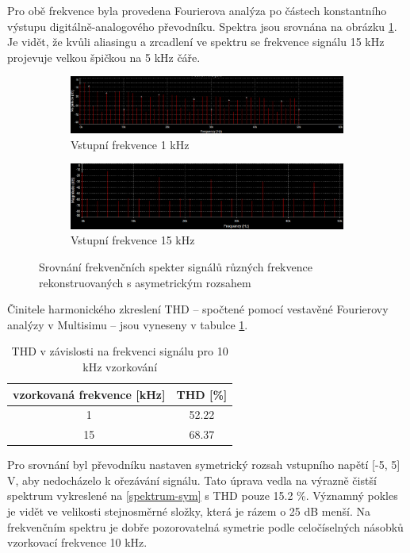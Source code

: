 \documentclass[twoside]{article}
\begin{document}
Pro obě frekvence byla provedena Fourierova analýza
po částech konstantního výstupu digitálně-analogového převodníku.
Spektra jsou srovnána na obrázku \ref{spektra}. Je vidět, že
kvůli aliasingu a zrcadlení ve spektru se frekvence signálu
15 kHz projevuje velkou špičkou na 5 kHz čáře.

\begin{figure}[h]
    \begin{subfigure}{\textwidth}
        \includegraphics[width=\textwidth]{spektrum-1khz.png}
        \caption{Vstupní frekvence 1 kHz}
    \end{subfigure}

    \begin{subfigure}{\textwidth}
        \includegraphics[width=\textwidth]{spektrum-15khz.png}
        \caption{Vstupní frekvence 15 kHz}
    \end{subfigure}
    \caption{Srovnání frekvenčních spekter signálů různých frekvence rekonstruovaných s asymetrickým rozsahem}
    \label{spektra}
\end{figure}

Činitele harmonického zkreslení THD -- spočtené pomocí vestavěné Fourierovy analýzy v Multisimu -- jsou vyneseny v tabulce \ref{thd}.

\begin{table}[h]
    \centering
    \begin{tabular}{c|c}
        vzorkovaná frekvence [kHz] & THD [\%]\\ \hline
        1 & 52.22 \\
        15 & 68.37 \\
    \end{tabular}
    \caption{THD v závislosti na frekvenci signálu pro 10 kHz vzorkování}
    \label{thd}
\end{table}

Pro srovnání byl převodníku nastaven symetrický rozsah vstupního napětí [-5, 5] V,
aby nedocházelo k ořezávání signálu. Tato úprava vedla na výrazně čistší spektrum
vykreslené na \ref{spektrum-sym} s THD pouze 15.2 \%.
Významný pokles je vidět ve velikosti stejnosměrné složky, která je rázem o 25 dB menší.
Na frekvenčním spektru je dobře pozorovatelná symetrie podle celočíselných násobků
vzorkovací frekvence 10 kHz.
\end{document}
